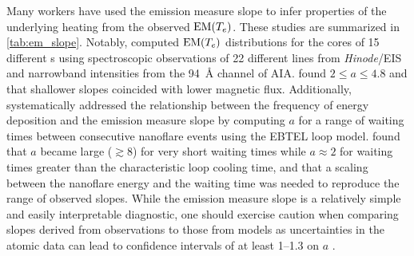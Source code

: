 Many workers have used the emission measure slope to infer properties of the underlying heating from the observed $\textup{EM}(T_e)$. These studies are summarized in \autoref{tab:em_slope}. Notably, \citet{warren_systematic_2012} computed $\textup{EM}(T_e)$ distributions for the cores of 15 different \AR s using spectroscopic observations of 22 different lines from \textit{Hinode}/EIS and narrowband intensities from the \SI{94}{\angstrom} channel of AIA. \citeauthor{warren_systematic_2012} found $2\le a\le 4.8$ and that shallower slopes coincided with lower magnetic flux. Additionally, \citet{cargill_active_2014} systematically addressed the relationship between the frequency of energy deposition and the emission measure slope by computing $a$ for a range of waiting times between consecutive nanoflare events using the EBTEL loop model. \citeauthor{cargill_active_2014} found that $a$ became large ($\gtrsim8$) for very short waiting times while $a\approx2$ for waiting times greater than the characteristic loop cooling time, and that a scaling between the nanoflare energy and the waiting time was needed to reproduce the range of observed slopes. While the emission measure slope is a relatively simple and easily interpretable diagnostic, one should exercise caution when comparing slopes derived from observations to those from models as uncertainties in the atomic data can lead to confidence intervals of at least \numrange{1}{1.3} on $a$ \citep{guennou_can_2013}.

